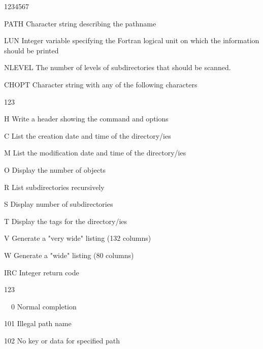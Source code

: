 \begin{DLtt}{1234567}
\item[PATH]Character string describing the pathname
\item[LUN]Integer variable specifying the Fortran logical unit on
  which the information should be printed
\item[NLEVEL]The number of levels of subdirectories that should
be scanned.
\item[CHOPT]Character string with any of the following characters
  \begin{DLtt}{123}
  \item[H]Write a header showing the command and options
  \item[C]List the creation date and time of the directory/ies
  \item[M]List the modification date and time of the directory/ies
  \item[O]Display the number of objects
  \item[R]List subdirectories recursively
  \item[S]Display number of subdirectories
  \item[T]Display the tags for the directory/ies
  \item[V]Generate a "very wide" listing (132 columns)
  \item[W]Generate a "wide" listing (80 columns)
  \end{DLtt}
\item[IRC]Integer return code
  \begin{DLtt}{123}
    \item[\ \ 0]Normal completion
    \item[101]Illegal path name
    \item[102]No key or data for specified path
  \end{DLtt}
\end{DLtt}

